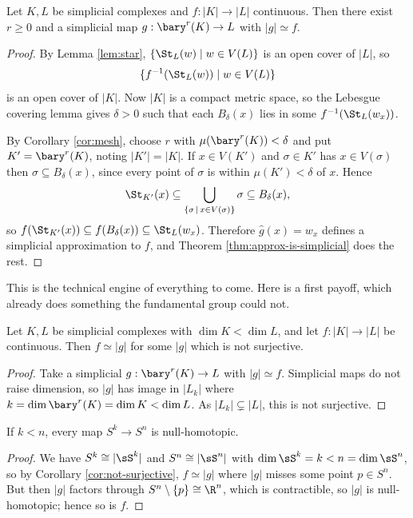 \begin{theorem} \label{thm:sat}
	Let $K, L$ be simplicial complexes and $f: |K| \to |L|$ continuous. Then there exist $r \geq 0$ and a simplicial map $g: \bary^r(K) \to L$ with $|g| \simeq f$.
\end{theorem}
\begin{proof}
	By Lemma \ref{lem:star}, $\{\St_L(w) \mid w \in V(L)\}$ is an open cover of $|L|$, so
	$$
	\{f^{-1}(\St_L(w)) \mid w \in V(L)\}
	$$
	is an open cover of $|K|$. Now $|K|$ is a compact metric space, so the Lebesgue covering lemma gives $\delta > 0$ such that each $B_\delta(x)$ lies in some $f^{-1}(\St_L(w_x))$.

	By Corollary \ref{cor:mesh}, choose $r$ with $\mu(\bary^r(K)) < \delta$ and put $K' = \bary^r(K)$, noting $|K'| = |K|$. If $x \in V(K')$ and $\sigma \in K'$ has $x \in V(\sigma)$ then $\sigma \subseteq B_\delta(x)$, since every point of $\sigma$ is within $\mu(K') < \delta$ of $x$. Hence
	$$
	\St_{K'}(x) \subseteq \bigcup_{\{\sigma \,\mid\, x \in V(\sigma)\}}\sigma \subseteq B_\delta(x),
	$$
	so $f(\St_{K'}(x)) \subseteq f(B_\delta(x)) \subseteq \St_L(w_x)$. Therefore $\hat g(x) = w_x$ defines a simplicial approximation to $f$, and Theorem \ref{thm:approx-is-simplicial} does the rest.
\end{proof}

This is the technical engine of everything to come. Here is a first payoff, which already
does something the fundamental group could not.

\begin{corollary} \label{cor:not-surjective}
	Let $K, L$ be simplicial complexes with $\dim K < \dim L$, and let $f: |K|\to|L|$ be continuous. Then $f \simeq |g|$ for some $|g|$ which is not surjective.
\end{corollary}
\begin{proof}
	Take a simplicial $g: \bary^r(K)\to L$ with $|g|\simeq f$. Simplicial maps do not raise dimension, so $|g|$ has image in $|L_k|$ where $k = \dim\bary^r(K) = \dim K < \dim L$. As $|L_k| \subsetneq |L|$, this is not surjective.
\end{proof}

\begin{theorem} \label{thm:sk-to-sn}
	If $k < n$, every map $S^k \to S^n$ is null-homotopic.
\end{theorem}
\begin{proof}
	We have $S^k \cong |\sS^k|$ and $S^n \cong |\sS^n|$ with $\dim \sS^k = k < n = \dim\sS^n$, so by Corollary \ref{cor:not-surjective}, $f \simeq |g|$ where $|g|$ misses some point $p \in S^n$. But then $|g|$ factors through $S^n\setminus\{p\}\cong\R^n$, which is contractible, so $|g|$ is null-homotopic; hence so is $f$.
\end{proof}

